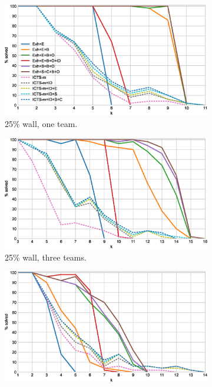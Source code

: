 \documentclass[english]{article}
\newcommand\graphwidth{0.49\textwidth}
\begin{document}
	\begin{figure}[t]
		\centering
		\begin{subfigure}{\graphwidth}
			\centering
			\includegraphics[width=\linewidth]{img/results/icts-comparison/25-1-p}
			\caption{25\% wall, one team.}
			\label{fig:i-25-1-p}
		\end{subfigure}
		\begin{subfigure}{\graphwidth}
			\centering
			\includegraphics[width=\linewidth]{img/results/icts-comparison/25-3-p}
			\caption{25\% wall, three teams.}
			\label{fig:i-25-3-p}
		\end{subfigure}
		\begin{subfigure}{\graphwidth}
			\centering
			\includegraphics[width=\linewidth]{img/results/icts-comparison/75-1-p}

\end{subfigure}
\end{figure}
\end{document}
